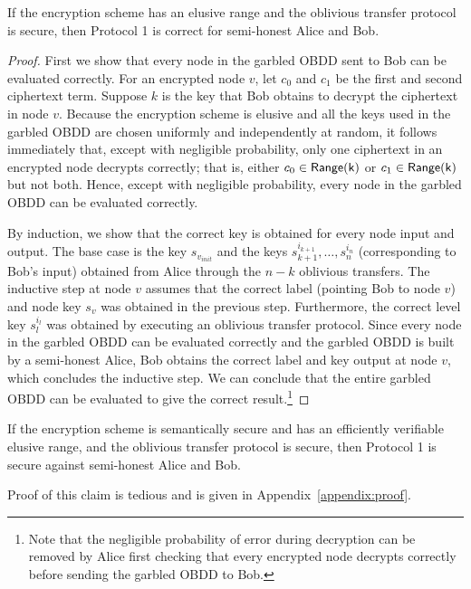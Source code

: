 \begin{claim} If the encryption scheme has an elusive range and the
oblivious transfer protocol is secure, then Protocol 1 is correct for
semi-honest Alice and Bob.
\label{claim:protocol1correct}
\end{claim}
\begin{proof}
First we show that every node in the garbled OBDD sent to Bob can be
evaluated correctly. For an encrypted node $v$, let $c_0$ and $c_1$ be
the first and second ciphertext term. Suppose $k$ is the key that Bob
obtains to decrypt the ciphertext in node $v$. Because the
encryption scheme is elusive and all the keys used in the garbled OBDD
are chosen uniformly and independently at random, it follows
immediately that, except with negligible probability, only one
ciphertext in an encrypted node decrypts correctly; that is,
either $c_0\in\mathsf{Range(k)}$ or $c_1\in\mathsf{Range(k)}$ but not
both. Hence, except with negligible probability, every node in the
garbled OBDD can be evaluated correctly.

By induction, we show that the correct key is obtained for every node
input and output. The base case is the key $s_{v_{init}}$ and the 
keys $s^{i_{k+1}}_{k+1},\ldots,s^{i_{n}}_{n}$ (corresponding to Bob's
input) obtained from Alice through the $n-k$ oblivious transfers. The
inductive step at node $v$ assumes that the correct label (pointing
Bob to node $v$) and node key $s_v$ was obtained in the previous
step. Furthermore, the correct level key $s_l^{i_l}$ was obtained by
executing an oblivious transfer protocol. Since every node in the
garbled OBDD can be evaluated correctly and the garbled OBDD is built by
a semi-honest Alice, Bob obtains the correct label and key output at
node $v$, which concludes the inductive step. We can conclude that the
entire garbled OBDD can be evaluated to give the correct result.\footnote{
Note that the negligible probability of error during
decryption can be removed by Alice first checking that every encrypted
node decrypts correctly before sending the garbled OBDD to Bob.
}
\end{proof}



\begin{claim} If the encryption scheme is semantically secure and has an
efficiently verifiable elusive range, and the oblivious transfer
protocol is secure, then Protocol 1 is secure against semi-honest
Alice and Bob.
\label{claim:protocol1secure}
\end{claim}
Proof of this claim is tedious and is given in Appendix~\ref{appendix:proof}.


